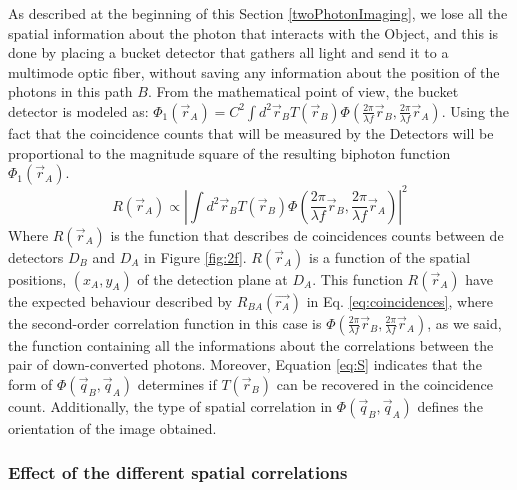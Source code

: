 As described at the beginning of this Section \ref{twoPhotonImaging}, we lose all the spatial information 
about the photon that interacts with the Object, and this is done by placing a bucket detector that
gathers all light and send it to a multimode optic fiber, without saving any information about the position
of the photons in this path $B$. From the mathematical point of view, the bucket detector is modeled
as: $\Phi_1 (\vec{r}_A) = C^2 \int d^2 \vec{r}_B T(\vec{r}_B) \Phi (\frac{2 \pi}{\lambda f}\vec{r}_B, \frac{2 \pi}{\lambda f}\vec{r}_A)$.
Using the fact that the coincidence counts that will be measured by the Detectors will be 
proportional to the magnitude square of the resulting biphoton function $\Phi_1 (\vec{r}_A)$\cite{introquantumoptics}.
\begin{equation}\label{eq:R}
R(\vec{r}_A) \propto |  \int d^2 \vec{r}_B T(\vec{r}_B) \Phi (\frac{2 \pi}{\lambda f}\vec{r}_B, \frac{2 \pi}{\lambda f}\vec{r}_A) |^2
\end{equation}
Where $R(\vec{r}_A)$ is the function that describes de coincidences counts between de detectors $D_B$ and 
$D_A$ in Figure \ref{fig:2f}. $R(\vec{r}_A)$ is a function of the spatial positions, $(x_A,y_A)$
 of the detection plane at $D_A$. This function $R(\vec{r}_A)$ have the expected behaviour described
by $R_{BA}(\vec{r_A})$ in Eq. \ref{eq:coincidences}, where the second-order correlation function in this 
case is $\Phi (\frac{2 \pi}{\lambda f}\vec{r}_B, \frac{2 \pi}{\lambda f}\vec{r}_A)$, as we said, the function
containing all the informations about the correlations between the pair of down-converted photons. 
Moreover, Equation \ref{eq:S} indicates that the form of $\Phi(\vec{q}_B,\vec{q}_A)$ determines if $T(\vec{r}_B)$ can
be recovered in the coincidence count. Additionally, the type of spatial correlation in $\Phi(\vec{q}_B,\vec{q}_A)$
defines the orientation of the image obtained.

\subsubsection{Effect of the different spatial correlations}



